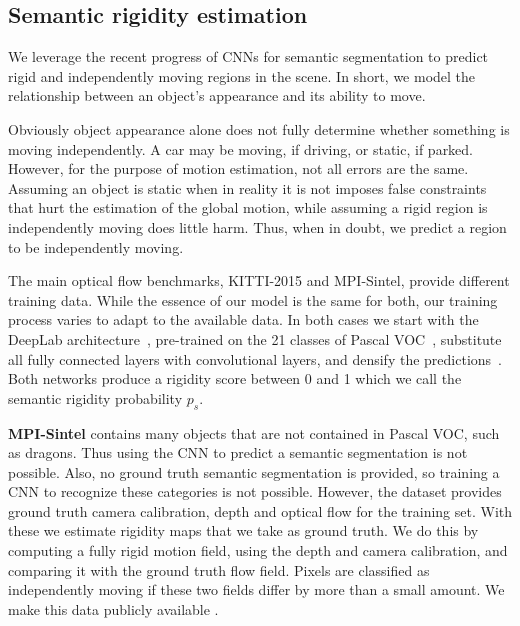 \documentclass[10pt,twocolumn,letterpaper]{article}
\begin{document}
\subsection{Semantic rigidity estimation}
\label{sec:rigidity_cnn}
\noindent









\noindent
We leverage the recent progress of CNNs for semantic segmentation to predict rigid and independently moving regions in the scene. In short, we model the relationship between an object's appearance and its ability to move. 

Obviously object appearance alone does not fully determine whether something is moving independently. 
A car may be moving, if driving, or static, if parked. 
However, for the purpose of motion estimation, not all errors are the same. 
Assuming an object is static when in reality it is not imposes false constraints that hurt the estimation of the global motion,
while assuming a rigid region is independently moving does little harm.
Thus, when in doubt, we predict a region to be independently moving.



The main optical flow benchmarks, KITTI-2015 and MPI-Sintel, provide different training data. While the essence of our model is the same for both, our training process varies to adapt to the available data. In both cases we start with the DeepLab architecture~\cite{ChenPKMY14}, pre-trained on the 21 classes of Pascal VOC~\cite{pascalVOC}, substitute all fully connected layers with convolutional layers,
and densify the predictions~\cite{Sevilla:SOF}. Both networks produce a rigidity score between 0 and 1 which we call the semantic rigidity probability $p_{s}$.

{\bf MPI-Sintel} contains many objects that are not contained in Pascal VOC, such as dragons. Thus using the CNN to predict a semantic segmentation is not possible. Also, no ground truth semantic segmentation is provided, so training a CNN to recognize these categories is not possible. However, the dataset provides ground truth camera calibration, depth and optical flow for the training set. With these we estimate rigidity maps that we take as ground truth. We do this by computing a fully rigid motion field, using the depth and camera calibration, and comparing it with the ground truth flow field. 
Pixels are classified as independently moving if these two fields differ by more than a small amount.
We make this data publicly available \cite{MRFlow:Website}.
\end{document}
